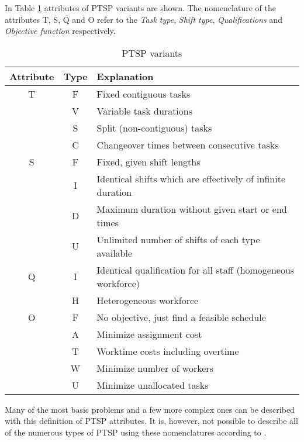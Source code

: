 In Table \ref{tab:PTSP} attributes of PTSP variants are shown. The nomenclature of the attributes T, S, Q and O refer to the \textit{Task type}, \textit{Shift type}, \textit{Qualifications} and \textit{Objective function} respectively. 
\begin{table}[H]
\caption{PTSP variants}
\label{tab:PTSP}
\begin{tabular}{|c|c|l|}
\hline
\textbf{Attribute} & \textbf{Type} & \textbf{Explanation} \\ \hline
T & F & Fixed contiguous tasks \\
& V & Variable task durations \\
& S & Split (non-contiguous) tasks \\
& C & Changeover times between consecutive tasks \\
\hline 
S & F & Fixed, given shift lengths \\
& I & Identical shifts which are effectively of infinite duration \\
& D & Maximum duration without given start or end times \\
& U & Unlimited number of shifts of each type available \\
\hline 
Q & I & Identical qualification for all staff (homogeneous workforce) \\
& H & Heterogeneous workforce \\
\hline 
O & F & No objective, just find a feasible schedule \\
& A & Minimize assignment cost \\
& T & Worktime costs including overtime \\
& W & Minimize number of workers \\
& U & Minimize unallocated tasks \\
\hline  

\end{tabular}
\end{table}

Many of the most basic problems and a few more complex ones can be described with this definition of PTSP attributes. It is, however, not possible to describe all of the numerous types of PTSP using these nomenclatures according to \citet{krishnamoorthy_2001}.

